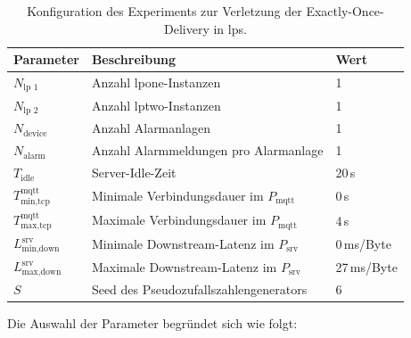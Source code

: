 \begin{table}[H]
	\centering
	\renewcommand{\arraystretch}{1.2}
	\caption{Konfiguration des Experiments zur Verletzung der Exactly-Once-Delivery in \acrshort{lps}.}
	\label{tab:exp-lps-eod-config}
	\begin{tabular}{|l|l|l|}
		\hline
		\textbf{Parameter}                 & \textbf{Beschreibung}                          & \textbf{Wert} \\
		\hline
		$N_{\text{lp~1}}$                  & Anzahl \gls{lpone}-Instanzen                   & 1             \\
		$N_{\text{lp~2}}$                  & Anzahl \gls{lptwo}-Instanzen                   & 1             \\
		$N_{\text{device}}$                & Anzahl Alarmanlagen                            & 1             \\
		$N_{\text{alarm}}$                 & Anzahl Alarmmeldungen pro Alarmanlage          & 1             \\
		$T_{\text{idle}}$                  & Server-Idle-Zeit                               & 20\,s         \\
		$T_{\text{min,tcp}}^{\text{mqtt}}$ & Minimale Verbindungsdauer im $P_{\text{mqtt}}$ & 0\,s          \\
		$T_{\text{max,tcp}}^{\text{mqtt}}$ & Maximale Verbindungsdauer im $P_{\text{mqtt}}$ & 4\,s          \\
		$L_{\text{min,down}}^{\text{srv}}$ & Minimale Downstream-Latenz im $P_{\text{srv}}$ & 0\,ms/Byte    \\
		$L_{\text{max,down}}^{\text{srv}}$ & Maximale Downstream-Latenz im $P_{\text{srv}}$ & 27\,ms/Byte   \\
		$S$                                & Seed des Pseudozufallszahlengenerators         & 6             \\
		\hline
	\end{tabular}
\end{table}

\newpage

Die Auswahl der Parameter begründet sich wie folgt:


